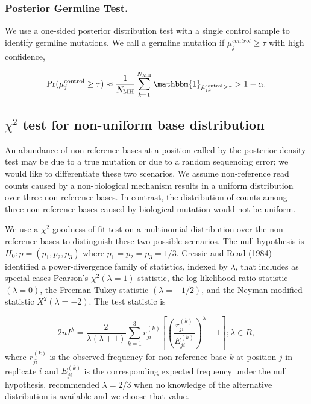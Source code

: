 \documentclass{bioinfo}
\begin{document}
\subsubsection*{Posterior Germline Test.}

We use a one-sided posterior distribution test with a single control sample to identify germline mutations. We call a germline mutation if $ \mu_j^{control} \geq \tau$ with high confidence,

\begin{equation}\label{eqn:germ_test}
	\Pr(\mu_j^{\text{control}}  \geq \tau ) \approx \frac{1}{N_{\text{MH}}} \sum_{k=1}^{N_{\text{MH}}} \mathbbm{1}_{\tilde{\mu}_{jk}^{\text{control}} \geq \tau } > 1-\alpha.
\end{equation}

\subsection{$\chi^2$ test for non-uniform base distribution}

An abundance of non-reference bases at a position called by the posterior density test may be due to a true mutation or due to a random sequencing error; we would like to differentiate these two scenarios. We assume non-reference read counts caused by a non-biological mechanism results in a uniform distribution over three non-reference bases. In contrast, the distribution of counts among three non-reference bases caused by biological mutation would not be uniform.

We use a $\chi^2$ goodness-of-fit test on a multinomial distribution over the non-reference bases to distinguish these two possible scenarios. The null hypothesis is $H_0: p = (p_1, p_2, p_3)$ where $p_1=p_2=p_3=1/3$. Cressie and Read (1984) identified a power-divergence family of statistics, indexed by $\lambda$, that includes as special cases Pearson's $\chi^2 (\lambda = 1)$ statistic, the log likelihood ratio statistic $(\lambda = 0)$, the Freeman-Tukey statistic $(\lambda = -1/2)$, and the Neyman modified statistic $X^2 (\lambda = -2)$. The test statistic is

\begin{equation}
 2nI^\lambda = \frac{2}{\lambda(\lambda+1)}\sum_{k=1}^3 r_{ji}^{(k)} \left[\left(\frac{r_{ji}^{(k)}}{E_{ji}^{(k)}}\right)^\lambda-1\right];\lambda \in R,
\end{equation}
where $r_{ji}^{(k)}$ is the observed frequency for non-reference base $k$ at position $j$ in replicate $i$ and $E_{ji}^{(k)}$ is the corresponding expected frequency under the null hypothesis. \citet{cressie1984multinomial} recommended $\lambda = 2/3$ when no knowledge of the alternative distribution is available and we choose that value.
\end{document}
